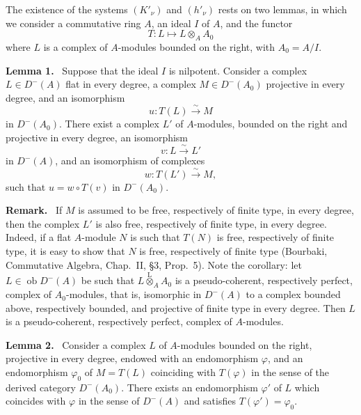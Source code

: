 \documentclass[11pt]{article}
\newenvironment{statement}[1]{\par\medskip\noindent\textbf{#1.}\ }{\par\medskip}
\providecommand{\lten}{\overset{\mathrm L}{\otimes}}
\providecommand{\Ob}{\operatorname{ob}}
\providecommand{\lten}{\overset{\mathrm L}{\otimes}}
\providecommand{\lten}{\overset{\mathrm L}{\otimes}}
\providecommand{\Ob}{\operatorname{ob}}
\providecommand{\lten}{\overset{\mathrm L}{\otimes}}
\providecommand{\lten}{\overset{\mathrm L}{\otimes}}
\providecommand{\Ob}{\operatorname{Ob}}
\providecommand{\lten}{\overset{\mathrm L}{\otimes}}
\providecommand{\Ob}{\operatorname{ob}}
\providecommand{\Ob}{\operatorname{Ob}}
\providecommand{\lten}{\overset{\mathrm L}{\otimes}}
\begin{document}
The existence of the systems $(K'_\nu)$ and $(h'_\nu)$ rests on two lemmas, in which we consider a commutative ring $A$, an ideal $I$ of $A$, and the functor
\[
T:L\longmapsto L\otimes_A A_0
\]
where $L$ is a complex of $A$-modules bounded on the right, with $A_0=A/I$.

\begin{statement}{Lemma 1}
Suppose that the ideal $I$ is nilpotent. Consider a complex $L\in D^-(A)$ flat in every degree, a complex $M\in D^-(A_0)$ projective in every degree, and an isomorphism
\[
u:T(L)\xrightarrow{\sim}M
\]
in $D^-(A_0)$. There exist a complex $L'$ of $A$-modules, bounded on the right and projective in every degree, an isomorphism
\[
v:L\xrightarrow{\sim}L'
\]
in $D^-(A)$, and an isomorphism of complexes
\[
w:T(L')\xrightarrow{\sim}M,
\]
such that $u=w\circ T(v)$ in $D^-(A_0)$.
\end{statement}

\begin{statement}{Remark}
If $M$ is assumed to be free, respectively of finite type, in every degree, then the complex $L'$ is also free, respectively of finite type, in every degree. Indeed, if a flat $A$-module $N$ is such that $T(N)$ is free, respectively of finite type, it is easy to show that $N$ is free, respectively of finite type (Bourbaki, Commutative Algebra, Chap.~II, §3, Prop.~5). Note the corollary: let $L\in\Ob D^-(A)$ be such that $L\lten_A A_0$ is a pseudo-coherent, respectively perfect, complex of $A_0$-modules, that is, isomorphic in $D^-(A)$ to a complex bounded above, respectively bounded, and projective of finite type in every degree. Then $L$ is a pseudo-coherent, respectively perfect, complex of $A$-modules.
\end{statement}

\begin{statement}{Lemma 2}
Consider a complex $L$ of $A$-modules bounded on the right, projective in every degree, endowed with an endomorphism $\varphi$, and an endomorphism $\varphi_0$ of $M=T(L)$ coinciding with $T(\varphi)$ in the sense of the derived category $D^-(A_0)$. There exists an endomorphism $\varphi'$ of $L$ which coincides with $\varphi$ in the sense of $D^-(A)$ and satisfies $T(\varphi')=\varphi_0$.
\end{statement}
\end{document}
